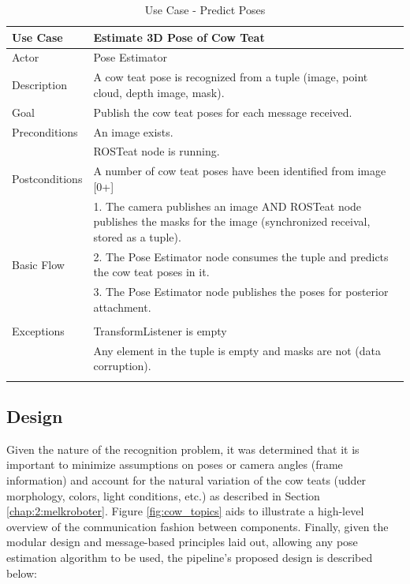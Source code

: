 \begin{longtable}{@{} p{3.5cm} p{10.5cm} @{}} \toprule
\textbf{Use Case}       & \textbf{Estimate 3D Pose of Cow Teat} \\ \midrule
Actor                   & Pose Estimator \\ \cmidrule{1-2}
Description             & A cow teat pose is recognized from a tuple (image, point cloud, depth image, mask). \\ \cmidrule{1-2}
Goal                    & Publish the cow teat poses for each message received. \\ \cmidrule{1-2}
Preconditions           & An image exists. \\ 
                        & ROSTeat node is running. \\ \cmidrule{1-2} 
Postconditions          & A number of cow teat poses have been identified from image [0+]\\ \cmidrule{1-2} 
                        & 1. The camera publishes an image AND ROSTeat node publishes the masks for the image (synchronized receival, stored as a tuple). \\ 
Basic Flow              & 2. The Pose Estimator node consumes the tuple and predicts the cow teat poses in it. \\
                        & 3. The Pose Estimator node publishes the poses for posterior attachment. \\ \cmidrule{1-2}
                        \\
                        \cmidrule{1-2}
Exceptions             & TransformListener is empty \\ 
                       & Any element in the tuple is empty and masks are not (data corruption). \\ \bottomrule
\caption{Use Case - Predict Poses} \label{tab:use-pose} \\
\end{longtable}

\subsection{Design}
Given the nature of the recognition problem, it was determined that it is important to minimize assumptions on poses or camera angles (frame information) and account for the natural variation of the cow teats (udder morphology, colors, light conditions, etc.) as described in Section \ref{chap:2:melkroboter}.
Figure \ref{fig:cow_topics} aids to illustrate a high-level overview of the communication fashion between components.
Finally, given the modular design and message-based principles laid out, allowing any pose estimation algorithm to be used, the pipeline's proposed design is described below:

